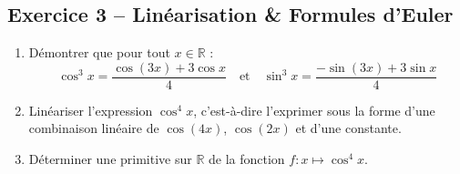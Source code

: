 \documentclass[11pt,a4paper]{article}
\newcommand{\R}{\mathbb{R}}
\begin{document}
\vspace{0.3cm}

\subsection*{Exercice 3 -- Linéarisation \& Formules d'Euler}

\begin{enumerate}[label=\arabic*.]
    \item Démontrer que pour tout $x \in \R$ :
    \[
    \cos^3 x = \frac{\cos(3x) + 3\cos x}{4} \quad \text{et} \quad \sin^3 x = \frac{-\sin(3x) + 3\sin x}{4}
    \]
    \item Linéariser l'expression $\cos^4 x$, c'est-à-dire l'exprimer sous la forme d'une combinaison linéaire de $\cos(4x)$, $\cos(2x)$ et d'une constante.
    \item Déterminer une primitive sur $\R$ de la fonction $f : x \mapsto \cos^4 x$.
\end{enumerate}
\end{document}
